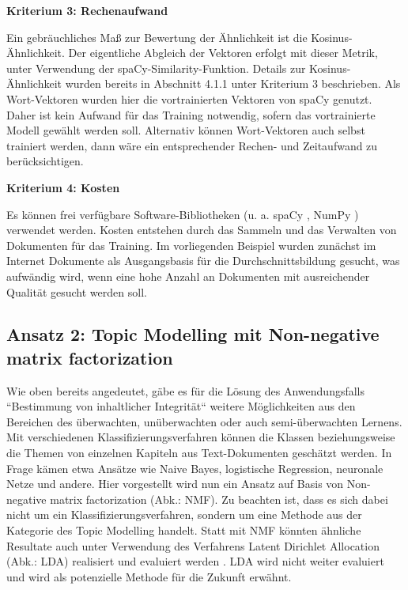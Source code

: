 {\bf Kriterium 3: Rechenaufwand}

Ein gebräuchliches Maß zur Bewertung der Ähnlichkeit ist die Kosinus-Ähnlichkeit. Der eigentliche Abgleich der Vektoren erfolgt mit dieser Metrik, unter Verwendung der spaCy-Similarity-Funktion. Details zur Kosinus-Ähnlichkeit wurden bereits in Abschnitt 4.1.1 unter Kriterium 3 beschrieben. Als Wort-Vektoren wurden hier die vortrainierten Vektoren von spaCy genutzt. Daher ist kein Aufwand für das Training notwendig, sofern das vortrainierte Modell gewählt werden soll. Alternativ können Wort-Vektoren auch selbst trainiert werden, dann wäre ein entsprechender Rechen- und Zeitaufwand zu berücksichtigen.

{\bf Kriterium 4: Kosten}

Es können frei verfügbare Software-Bibliotheken (u. a. spaCy \cite{spacy-license}, NumPy \cite{numpy-license}) verwendet werden. Kosten entstehen durch das Sammeln und das Verwalten von Dokumenten für das Training. Im vorliegenden Beispiel wurden zunächst im Internet Dokumente als Ausgangsbasis für die Durchschnittsbildung gesucht, was aufwändig wird, wenn eine hohe Anzahl an Dokumenten mit ausreichender Qualität gesucht werden soll.

\subsection{Ansatz 2: Topic Modelling mit Non-negative matrix factorization}

Wie oben bereits angedeutet, gäbe es für die Lösung des Anwendungsfalls ``Bestimmung von inhaltlicher Integrität`` weitere Möglichkeiten aus den Bereichen des überwachten, unüberwachten oder auch semi-überwachten Lernens. Mit verschiedenen Klassifizierungsverfahren können die Klassen beziehungsweise die Themen von einzelnen Kapiteln aus Text-Dokumenten geschätzt werden. In Frage kämen etwa Ansätze wie Naive Bayes, logistische Regression, neuronale Netze und andere. Hier vorgestellt wird nun ein Ansatz auf Basis von Non-negative matrix factorization (Abk.: NMF). Zu beachten ist, dass es sich dabei nicht um ein Klassifizierungsverfahren, sondern um eine Methode aus der Kategorie des Topic Modelling handelt. Statt mit NMF könnten ähnliche Resultate auch unter Verwendung des Verfahrens Latent Dirichlet Allocation (Abk.: LDA) realisiert und evaluiert werden \cite{scikit1}. LDA wird nicht weiter evaluiert und wird als potenzielle Methode für die Zukunft erwähnt.

